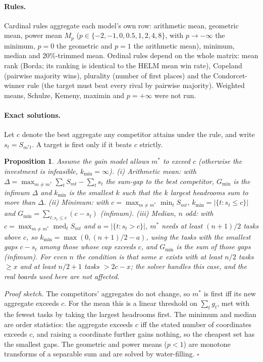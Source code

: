 \documentclass{article}
\newtheorem{proposition}{Proposition}
\begin{document}
\paragraph{Rules.}
Cardinal rules aggregate each model's own row: arithmetic mean, geometric mean, power mean $M_p$ ($p\in\{-2,-1,0,0.5,1,2,4,8\}$, with $p\to-\infty$ the minimum, $p=0$ the geometric and $p=1$ the arithmetic mean), minimum, median and 20\%-trimmed mean.
Ordinal rules depend on the whole matrix: mean rank (Borda; its ranking is identical to the HELM mean win rate), Copeland (pairwise majority wins), plurality (number of first places) and the Condorcet-winner rule (the target must beat every rival by pairwise majority).
Weighted means, Schulze, Kemeny, maximin and $p=+\infty$ were not run.

\paragraph{Exact solutions.}
Let $c$ denote the best aggregate any competitor attains under the rule, and write $s_t=S_{m^\ast t}$. A target is first only if it beats $c$ strictly.
\begin{proposition}\label{prop:rules}
Assume the gain model allows $m^\ast$ to exceed $c$ (otherwise the investment is infeasible, $k_{\min}=\infty$).
(i) Arithmetic mean: with $\Delta=\max_{m\ne m^\ast}\sum_t S_{mt}-\sum_t s_t$ the sum-gap to the best competitor, $G_{\min}$ is the infimum $\Delta$ and $k_{\min}$ is the smallest $k$ such that the $k$ largest headrooms sum to more than $\Delta$.
(ii) Minimum: with $c=\max_{m\ne m^\ast}\min_t S_{mt}$, $k_{\min}=|\{t:s_t\le c\}|$ and $G_{\min}=\sum_{t:s_t\le c}(c-s_t)$ (infimum).
(iii) Median, $n$ odd: with $c=\max_{m\ne m^\ast}\operatorname{med}_t S_{mt}$ and $a=|\{t:s_t>c\}|$, $m^\ast$ needs at least $(n+1)/2$ tasks above $c$, so $k_{\min}=\max(0,(n+1)/2-a)$, using the tasks with the smallest gaps $c-s_t$ among those whose cap exceeds $c$, and $G_{\min}$ is the sum of those gaps (infimum). For even $n$ the condition is that some $x$ exists with at least $n/2$ tasks $\ge x$ and at least $n/2+1$ tasks $>2c-x$; the solver handles this case, and the real boards used here are not affected.
\end{proposition}
\emph{Proof sketch.} The competitors' aggregates do not change, so $m^\ast$ is first iff its new aggregate exceeds $c$. For the mean this is a linear threshold on $\sum_t g_t$, met with the fewest tasks by taking the largest headrooms first. The minimum and median are order statistics: the aggregate exceeds $c$ iff the stated number of coordinates exceeds $c$, and raising a coordinate further gains nothing, so the cheapest set has the smallest gaps. The geometric and power means ($p<1$) are monotone transforms of a separable sum and are solved by water-filling. $\square$
\end{document}
